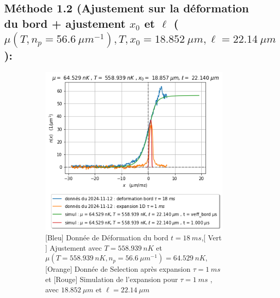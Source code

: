 \documentclass[a3, 10pt,twoside]{article}          %
\theoremstyle{plain}
\theoremstyle{definition}
\theoremstyle{remark}
\theoremstyle{definition} %
\begin{document}
			
	\subsection{Méthode 1.2 (Ajustement sur la déformation du bord + ajustement $x_0$ et $\ell$ ($\mu( T , n_p = 56.6 ~{\mu m}^{-1} ) , T , x_0 = 18.852 ~\mu m  , \ell = 22.14 ~ \mu m  $ ): } 
		
		
		
		\begin{figure}[H]
			\begin{subfigure}[b]{0.45\textwidth}
        		\centering
        		\includegraphics[width=\textwidth]{Figures/simul_deformation_18_24-04-2024-1.2.png}
        		\caption{{\color{blue} [Bleu] Donnée de Déformation du bord $t= 18 ~ms$},{\color{OliveGreen}[ Vert ]  Ajustement avec $T = 558.939 ~nK$ et $\mu ( T =558.939 ~nK  , n_p = 56.6 ~{\mu m}^{-1} )= 64.529~nK$}, {\color{orange}[Orange] Donnée de Selection après expansion $\tau = 1~ms$} et {\color{red}[Rouge] Simulation de l'expansion pour $\tau= 1~ms$  , avec $18.852 ~\mu m $ et $\ell = 22.14 ~ \mu m $ }  }
        		\label{fig1.2:ajustementdeform}
    		\end{subfigure}
    		\hfill
    		\begin{subfigure}[b]{0.45\textwidth}
        		\centering

\end{subfigure}
\end{figure}
\end{document}
